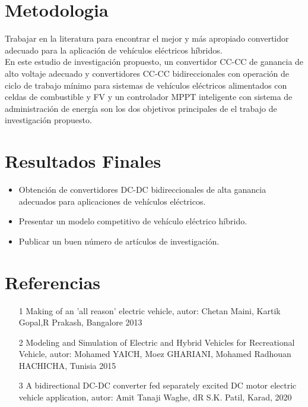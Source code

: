 \documentclass[12pt]{article}
\begin{document}
\section{Metodologia}
Trabajar en la literatura para encontrar el mejor y más apropiado convertidor adecuado para la aplicación de vehículos eléctricos híbridos. \\ En este estudio de investigación propuesto, un convertidor CC-CC de ganancia de alto voltaje adecuado y convertidores CC-CC bidireccionales con operación de ciclo de trabajo mínimo para sistemas de vehículos eléctricos alimentados con celdas de combustible y FV y un controlador MPPT inteligente con sistema de administración de energía son los dos objetivos principales de el trabajo de investigación propuesto.


\section{Resultados Finales}
\begin{itemize}
\item Obtención de convertidores DC-DC  bidireccionales de alta ganancia adecuados para aplicaciones de vehículos eléctricos.
\item Presentar un modelo competitivo de vehículo eléctrico híbrido.
\item Publicar un buen número de artículos de investigación.



\end{itemize}




\section{Referencias}
\begin{itemize}
\item [1] Making of an 'all reason' electric vehicle, autor: Chetan Maini, Kartik Gopal,R Prakash, Bangalore 2013    
\item [2] Modeling and Simulation of Electric and Hybrid Vehicles for Recreational Vehicle, autor: Mohamed YAICH, Moez GHARIANI, Mohamed Radhouan HACHICHA, Tunisia 2015
\item [3] A bidirectional DC-DC converter fed separately excited DC motor electric vehicle application, autor: Amit Tanaji Waghe, dR S.K. Patil, Karad, 2020






\end{itemize}
\end{document}
